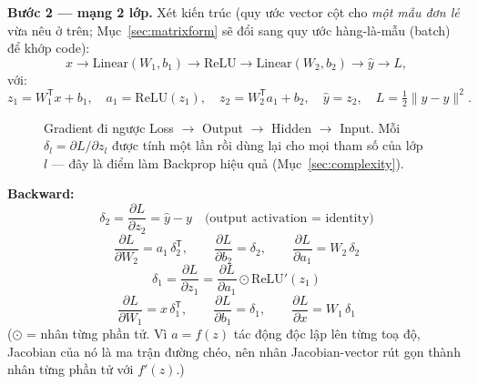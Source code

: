 \documentclass[12pt,a4paper]{report}
\makeatletter
\newcommand{\T}{^{\mathsf{T}}}
\renewcommand\small{\@setfontsize\small{13}{16.5}}
\makeatother
\begin{document}
\textbf{Bước 2 --- mạng 2 lớp.} Xét kiến trúc (quy ước vector cột cho
\emph{một mẫu đơn lẻ} vừa nêu ở trên; Mục~\ref{sec:matrixform}
sẽ đổi sang quy ước hàng-là-mẫu (batch) để khớp code):
$$x \to \mathrm{Linear}(W_1,b_1) \to \mathrm{ReLU} \to \mathrm{Linear}(W_2,b_2)
\to \hat y \to L,$$
với:
$$z_1 = W_1\T x + b_1,\quad a_1=\mathrm{ReLU}(z_1),\quad
z_2 = W_2\T a_1+b_2,\quad \hat y = z_2,\quad L=\tfrac12\lVert \hat y-y\rVert^2.$$

\begin{figure}[htbp]
\centering
{}
\caption{Gradient đi ngược Loss $\to$ Output $\to$ Hidden $\to$ Input. Mỗi
$\delta_l=\partial L/\partial z_l$ được tính một lần rồi dùng lại cho mọi
tham số của lớp $l$ --- đây là điểm làm Backprop hiệu quả (Mục~\ref{sec:complexity}).}
\label{fig:2layerflow}
\end{figure}

\textbf{Backward:}
$$\delta_2=\frac{\partial L}{\partial z_2}=\hat y-y \quad\text{(output activation = identity)}$$
$$\frac{\partial L}{\partial W_2}=a_1\,\delta_2\T,\qquad
\frac{\partial L}{\partial b_2}=\delta_2,\qquad
\frac{\partial L}{\partial a_1}=W_2\,\delta_2$$
$$\delta_1=\frac{\partial L}{\partial z_1}=\frac{\partial L}{\partial a_1}\odot \mathrm{ReLU}'(z_1)$$
$$\frac{\partial L}{\partial W_1}=x\,\delta_1\T,\qquad
\frac{\partial L}{\partial b_1}=\delta_1,\qquad
\frac{\partial L}{\partial x}=W_1\,\delta_1$$
($\odot$ = nhân từng phần tử. Vì $a=f(z)$ tác động độc lập lên từng toạ độ,
Jacobian của nó là ma trận đường chéo, nên nhân Jacobian-vector rút gọn
thành nhân từng phần tử với $f'(z)$.)
\end{document}
